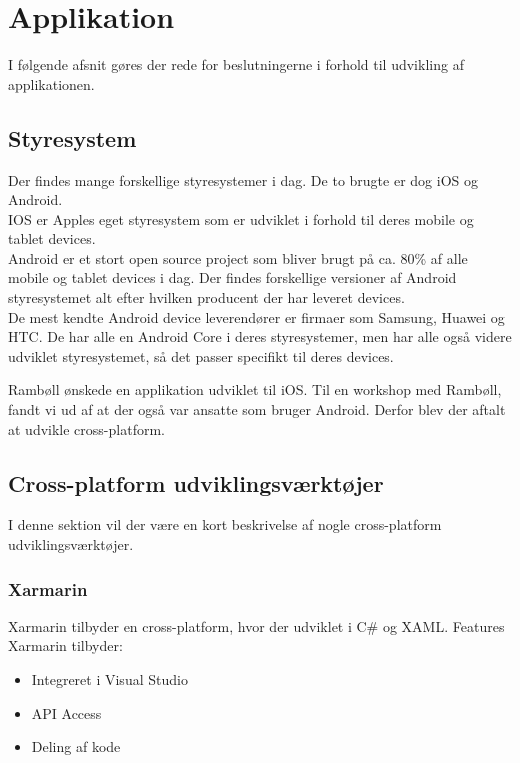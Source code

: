 \section{Applikation}                                   
I følgende afsnit gøres der rede for beslutningerne i forhold til udvikling af applikationen.

\subsection{Styresystem}
Der findes mange forskellige styresystemer i dag. De to brugte er dog iOS \cite{iOS} og Android. \cite{Android} \\
IOS er Apples eget styresystem som er udviklet i forhold til deres mobile og tablet devices. \\
Android er et stort open source project som bliver brugt på ca. 80\% af alle mobile og tablet devices i dag. Der findes forskellige versioner af Android styresystemet alt efter hvilken producent der har leveret devices. \\
De mest kendte Android device leverendører er firmaer som Samsung, Huawei og HTC. De har alle en Android Core i deres styresystemer, men har alle også videre udviklet styresystemet, så det passer specifikt til deres devices.

Rambøll ønskede en applikation udviklet til iOS. Til en workshop med Rambøll, fandt vi ud af at der også var ansatte som bruger Android. Derfor blev der aftalt at udvikle cross-platform. \\

\subsection{Cross-platform udviklingsværktøjer}
I denne sektion vil der være en kort beskrivelse af nogle cross-platform udviklingsværktøjer.

\subsubsection{Xarmarin}
Xarmarin tilbyder en cross-platform, hvor der udviklet i C\#\cite{CSharp} og XAML\cite{XAML}.
Features Xarmarin tilbyder:
\begin{itemize}[-]
	\item Integreret i Visual Studio
	\item API Access 
	\item Deling af kode
\end{itemize}

